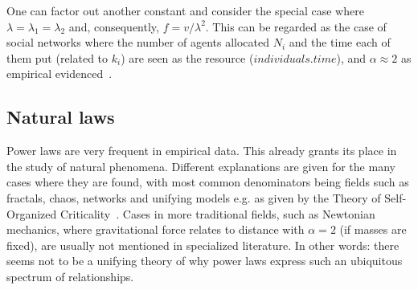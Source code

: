 \documentclass[a4paper, 11pt]{article} %
\begin{document}
One can factor out another constant and consider the special case where $\lambda=\lambda_1=\lambda_2$ and, consequently, $f=v/\lambda^2$.
This can be regarded as the case of social networks where the number of agents allocated $N_i$ and the time each of them put (related to $k_i$) are seen as the resource ($individuals . time$), and $\alpha\approx 2$
as empirical evidenced~\cite{newman}.

% 

\subsection{Natural laws}

Power laws are very frequent in empirical data.
This already grants its place in the study of natural phenomena.
Different explanations are given for the many cases where
they are found, with most common denominators being fields such as
fractals, chaos, networks and unifying models e.g. as given by the Theory of Self-Organized Criticality~\cite{part}.
Cases in more traditional fields, such as Newtonian mechanics, where gravitational force relates to distance with $\alpha=2$ (if masses are fixed), are usually not mentioned in specialized literature.
In other words: there seems not to be a unifying theory of why power laws express such
an ubiquitous spectrum of relationships.
\end{document}
